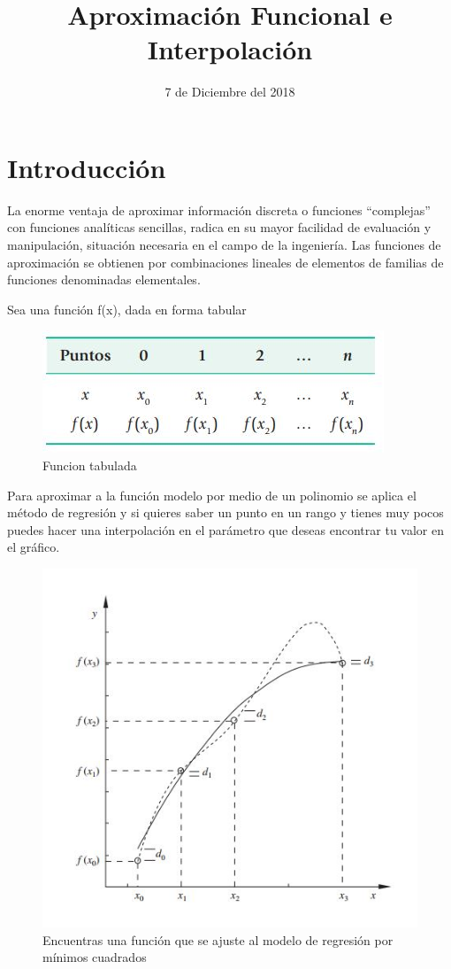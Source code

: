 \documentclass[12pt,letterpaper]{article}
\title{Aproximación Funcional e Interpolación}
\date{7 de Diciembre del 2018}
\begin{document}
\maketitle

\section{Introducción}
La enorme ventaja de aproximar información discreta o funciones “complejas” con funciones analíticas sencillas, radica en su mayor facilidad de evaluación y manipulación, situación necesaria en el campo de la ingeniería.
Las funciones de aproximación se obtienen por combinaciones lineales de elementos de familias de funciones denominadas elementales. 

Sea una función f(x), dada en forma tabular
\begin{figure}[hbtp]
\centering
\includegraphics[scale=1]{imagenes/funcion.JPG}
\caption{Funcion tabulada}
\end{figure}

Para aproximar a la función modelo por medio de un polinomio se aplica el método de regresión y si quieres saber un punto en un rango y tienes muy pocos puedes hacer una interpolación en el parámetro que deseas encontrar tu valor en el gráfico.

\begin{figure}[hbtp]
\centering
\includegraphics[scale=.4]{imagenes/ajuste.JPG}
\caption{Encuentras una función que se ajuste al modelo de regresión por mínimos cuadrados}
\end{figure}
\end{document}
